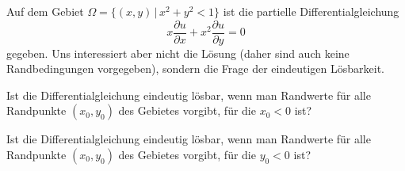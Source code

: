 Auf dem Gebiet $\Omega = \{ (x,y)\,|\, x^2+y^2 < 1\}$ ist die
partielle Differentialgleichung 
\begin{equation}
x\frac{\partial u}{\partial x}+x^2\frac{\partial u}{\partial y}=0
\label{30000008:dgl}
\end{equation}
gegeben. Uns interessiert aber nicht die Lösung (daher sind auch keine
Randbedingungen vorgegeben), sondern die Frage der eindeutigen Lösbarkeit.
\begin{teilaufgaben}
\item
Ist die Differentialgleichung eindeutig lösbar, wenn man Randwerte für
alle Randpunkte $(x_0,y_0)$ des Gebietes vorgibt, für die $x_0<0$ ist?
\item
Ist die Differentialgleichung eindeutig lösbar, wenn man Randwerte für
alle Randpunkte $(x_0,y_0)$ des Gebietes vorgibt, für die $y_0<0$ ist?
\end{teilaufgaben}

